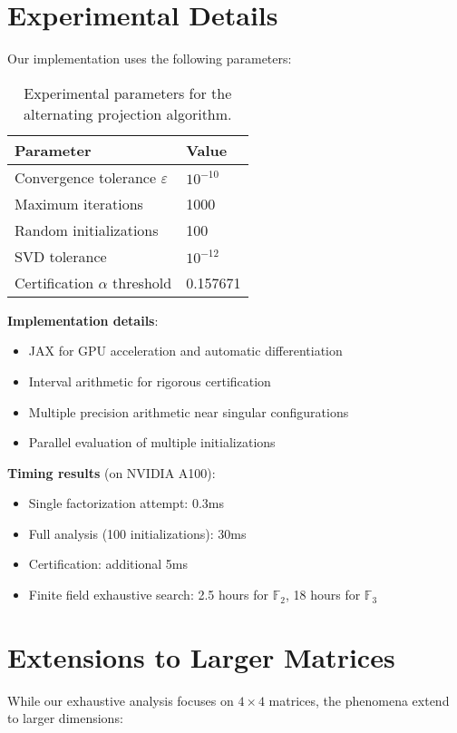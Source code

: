 \documentclass{article}
\theoremstyle{definition}
\begin{document}
\section{Experimental Details}

Our implementation uses the following parameters:

\begin{table}[h]
\centering
\begin{tabular}{ll}
\toprule
Parameter & Value \\
\midrule
Convergence tolerance $\varepsilon$ & $10^{-10}$ \\
Maximum iterations & 1000 \\
Random initializations & 100 \\
SVD tolerance & $10^{-12}$ \\
Certification $\alpha$ threshold & 0.157671 \\
\bottomrule
\end{tabular}
\caption{Experimental parameters for the alternating projection algorithm.}
\end{table}

\textbf{Implementation details}:
\begin{itemize}
\item JAX for GPU acceleration and automatic differentiation
\item Interval arithmetic for rigorous certification
\item Multiple precision arithmetic near singular configurations
\item Parallel evaluation of multiple initializations
\end{itemize}

\textbf{Timing results} (on NVIDIA A100):
\begin{itemize}
\item Single factorization attempt: 0.3ms
\item Full analysis (100 initializations): 30ms
\item Certification: additional 5ms
\item Finite field exhaustive search: 2.5 hours for $\mathbb{F}_2$, 18 hours for $\mathbb{F}_3$
\end{itemize}

\section{Extensions to Larger Matrices}

While our exhaustive analysis focuses on $4 \times 4$ matrices, the phenomena extend to larger dimensions:
\end{document}
